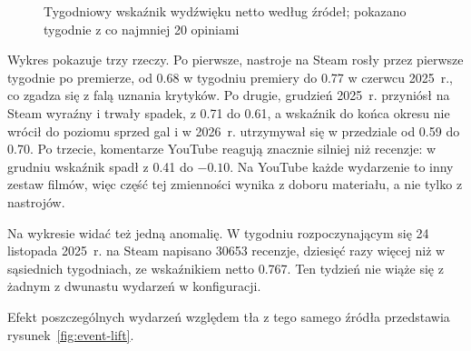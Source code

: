 \begin{figure}[hbp]
  \caption{Tygodniowy wskaźnik wydźwięku netto według źródeł; pokazano tygodnie z co najmniej 20 opiniami}
  \label{fig:weekly-net}
\end{figure}

Wykres pokazuje trzy rzeczy.
Po pierwsze, nastroje na Steam rosły przez pierwsze tygodnie po premierze, od \num{0.68} w tygodniu premiery do \num{0.77} w czerwcu 2025~r., co zgadza się z falą uznania krytyków.
Po drugie, grudzień 2025~r. przyniósł na Steam wyraźny i trwały spadek, z \num{0.71} do \num{0.61}, a wskaźnik do końca okresu nie wrócił do poziomu sprzed gal i w 2026~r. utrzymywał się w przedziale od \num{0.59} do \num{0.70}.
Po trzecie, komentarze YouTube reagują znacznie silniej niż recenzje: w grudniu wskaźnik spadł z \num{0.41} do $-\num{0.10}$.
Na YouTube każde wydarzenie to inny zestaw filmów, więc część tej zmienności wynika z doboru materiału, a nie tylko z nastrojów.

Na wykresie widać też jedną anomalię.
W tygodniu rozpoczynającym się 24 listopada 2025~r. na Steam napisano \num{30653} recenzje, dziesięć razy więcej niż w sąsiednich tygodniach, ze wskaźnikiem netto \num{0.767}.
Ten tydzień nie wiąże się z żadnym z dwunastu wydarzeń w konfiguracji.

Efekt poszczególnych wydarzeń względem tła z tego samego źródła przedstawia rysunek~\ref{fig:event-lift}.

